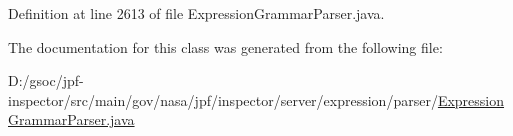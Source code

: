 Definition at line 2613 of file Expression\+Grammar\+Parser.\+java.



The documentation for this class was generated from the following file\+:\begin{DoxyCompactItemize}
\item 
D\+:/gsoc/jpf-\/inspector/src/main/gov/nasa/jpf/inspector/server/expression/parser/\hyperlink{_expression_grammar_parser_8java}{Expression\+Grammar\+Parser.\+java}\end{DoxyCompactItemize}
